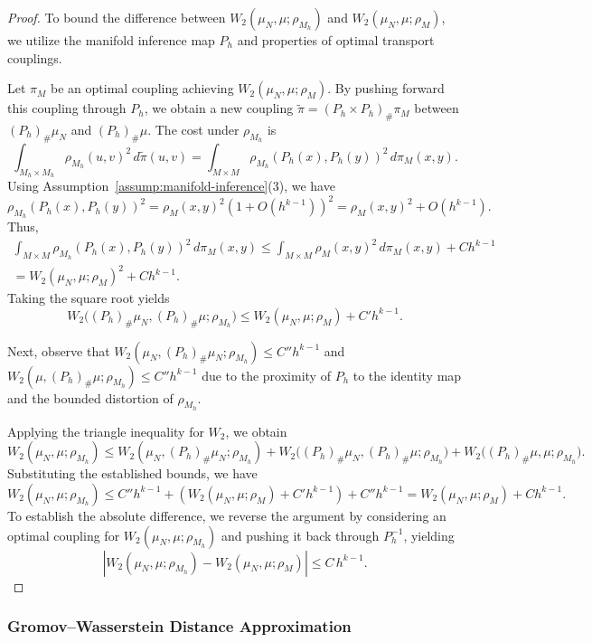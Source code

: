 \documentclass{article}
\theoremstyle{plain}
\theoremstyle{definition}
\theoremstyle{remark}
\begin{document}
\begin{proof}
To bound the difference between $W_2(\mu_N, \mu; \rho_{M_h})$ and $W_2(\mu_N, \mu; \rho_M)$, we utilize the manifold inference map $P_h$ and properties of optimal transport couplings.

Let $\pi_M$ be an optimal coupling achieving $W_2(\mu_N, \mu; \rho_M)$. By pushing forward this coupling through $P_h$, we obtain a new coupling $\widetilde{\pi} = (P_h \times P_h)_\# \pi_M$ between $(P_h)_\# \mu_N$ and $(P_h)_\# \mu$. The cost under $\rho_{M_h}$ is
$$
\int_{M_h \times M_h} \rho_{M_h}(u, v)^2 \, d\widetilde{\pi}(u, v) = \int_{M \times M} \rho_{M_h}(P_h(x), P_h(y))^2 \, d\pi_M(x, y).
$$
Using Assumption~\ref{assump:manifold-inference}(3), we have
$$
\rho_{M_h}(P_h(x), P_h(y))^2 = \rho_M(x, y)^2 \left(1 + O(h^{k-1})\right)^2 = \rho_M(x, y)^2 + O(h^{k-1}).
$$
Thus,
\begin{multline*}
    \int_{M \times M} \rho_{M_h}(P_h(x), P_h(y))^2 \, d\pi_M(x, y) \leq \int_{M \times M} \rho_M(x, y)^2 \, d\pi_M(x, y) + C h^{k-1}  \\ = W_2(\mu_N, \mu; \rho_M)^2 + C h^{k-1}.
\end{multline*}
Taking the square root yields
$$
W_2\big((P_h)_\# \mu_N, (P_h)_\# \mu; \rho_{M_h}\big) \leq W_2(\mu_N, \mu; \rho_M) + C' h^{k-1}.
$$

Next, observe that $W_2(\mu_N, (P_h)_\# \mu_N; \rho_{M_h}) \leq C'' h^{k-1}$ and $W_2(\mu, (P_h)_\# \mu; \rho_{M_h}) \leq C'' h^{k-1}$ due to the proximity of $P_h$ to the identity map and the bounded distortion of $\rho_{M_h}$.

Applying the triangle inequality for $W_2$, we obtain
$$
W_2(\mu_N, \mu; \rho_{M_h}) \leq W_2(\mu_N, (P_h)_\# \mu_N; \rho_{M_h}) + W_2\big((P_h)_\# \mu_N, (P_h)_\# \mu; \rho_{M_h}\big) + W_2\big((P_h)_\# \mu, \mu; \rho_{M_h}\big).
$$
Substituting the established bounds, we have
$$
W_2(\mu_N, \mu; \rho_{M_h}) \leq C'' h^{k-1} + \left(W_2(\mu_N, \mu; \rho_M) + C' h^{k-1}\right) + C'' h^{k-1} = W_2(\mu_N, \mu; \rho_M) + C h^{k-1}.
$$
To establish the absolute difference, we reverse the argument by considering an optimal coupling for $W_2(\mu_N, \mu; \rho_{M_h})$ and pushing it back through $P_h^{-1}$, yielding
$$
\left| W_2(\mu_N, \mu; \rho_{M_h}) - W_2(\mu_N, \mu; \rho_M) \right| \leq C\,h^{k-1}.
$$
\end{proof}

\subsubsection{Gromov--Wasserstein Distance Approximation}
\end{document}
